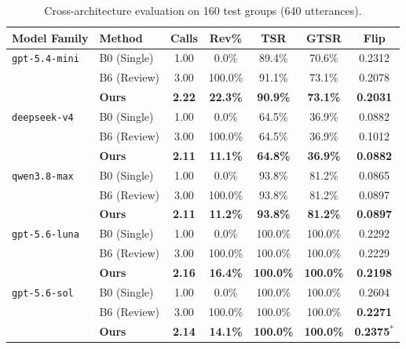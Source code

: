 \documentclass[conference]{IEEEtran}
\begin{document}
\begin{table}[t]
\centering
\caption{Cross-architecture evaluation on 160 test groups (640 utterances).}
\label{tab:cross_model}
\scriptsize
\setlength{\tabcolsep}{3.5pt}
\begin{tabular}{llccccc}
\toprule
\textbf{Model Family} & \textbf{Method} & \textbf{Calls} & \textbf{Rev\%} & \textbf{TSR} & \textbf{GTSR} & \textbf{Flip} \\
\midrule
\texttt{gpt-5.4-mini}  & B0 (Single)   & 1.00 & 0.0\%   & 89.4\% & 70.6\% & 0.2312 \\
                       & B6 (Review)   & 3.00 & 100.0\% & 91.1\% & 73.1\% & 0.2078 \\
                       & \textbf{Ours} & \textbf{2.22} & \textbf{22.3\%} & \textbf{90.9\%} & \textbf{73.1\%} & \textbf{0.2031} \\
\midrule
\texttt{deepseek-v4}   & B0 (Single)   & 1.00 & 0.0\%   & 64.5\% & 36.9\% & 0.0882 \\
                       & B6 (Review)   & 3.00 & 100.0\% & 64.5\% & 36.9\% & 0.1012 \\
                       & \textbf{Ours} & \textbf{2.11} & \textbf{11.1\%} & \textbf{64.8\%} & \textbf{36.9\%} & \textbf{0.0882} \\
\midrule
\texttt{qwen3.8-max}   & B0 (Single)   & 1.00 & 0.0\%   & 93.8\% & 81.2\% & 0.0865 \\
                       & B6 (Review)   & 3.00 & 100.0\% & 93.8\% & 81.2\% & 0.0897 \\
                       & \textbf{Ours} & \textbf{2.11} & \textbf{11.2\%} & \textbf{93.8\%} & \textbf{81.2\%} & \textbf{0.0897} \\
\midrule
\texttt{gpt-5.6-luna}  & B0 (Single)   & 1.00 & 0.0\%   & 100.0\% & 100.0\% & 0.2292 \\
                       & B6 (Review)   & 3.00 & 100.0\% & 100.0\% & 100.0\% & 0.2229 \\
                       & \textbf{Ours} & \textbf{2.16} & \textbf{16.4\%} & \textbf{100.0\%} & \textbf{100.0\%} & \textbf{0.2198} \\
\midrule
\texttt{gpt-5.6-sol}   & B0 (Single)   & 1.00 & 0.0\%   & 100.0\%  & 100.0\%  & 0.2604 \\
                       & B6 (Review)   & 3.00 & 100.0\% & 100.0\%  & 100.0\%  & \textbf{0.2271} \\
                       & \textbf{Ours} & \textbf{2.14} & \textbf{14.1\%} & \textbf{100.0\%} & \textbf{100.0\%} & \textbf{0.2375}$^*$ \\
\bottomrule
\end{tabular}
\end{table}
\end{document}
